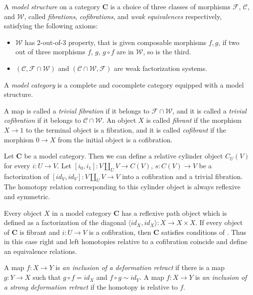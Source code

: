 \documentclass{amsart}
\theoremstyle{definition}
\newcommand{\we}{\mathcal{W}}
\newcommand{\fib}{\mathcal{F}}
\newcommand{\cof}{\mathcal{C}}
\newcommand{\cat}[1]{\mathbf{#1}}
\newcommand{\C}{\cat{C}}
\newcommand{\cyli}{i}
\begin{document}
\begin{defn}
A \emph{model structure} on a category $\C$ is a choice of three classes of morphisms $\fib$, $\cof$, and $\we$,
called \emph{fibrations}, \emph{cofibrations}, and \emph{weak equivalences} respectively, satisfying the following axioms:
\begin{itemize}
\item $\we$ has 2-out-of-3 property, that is given composable morphisms $f,g$,
    if two out of three morphisms $f$, $g$, $g \circ f$ are in $\we$, so is the third.
\item $(\cof, \fib \cap \we)$ and $(\cof \cap \we, \fib)$ are weak factorization systems.
\end{itemize}
A \emph{model category} is a complete and cocomplete category equipped with a model structure.
\end{defn}

A map is called a \emph{trivial fibration} if it belongs to $\fib \cap \we$,
and it is called a \emph{trivial cofibration} if it belongs to $\cof \cap \we$.
An object $X$ is called \emph{fibrant} if the morphism $X \to 1$ to the terminal object is a fibration,
and it is called \emph{cofibrant} if the morphism $0 \to X$ from the initial object is a cofibration.

Let $\C$ be a model category.
Then we can define a relative cylinder object $C_U(V)$ for every $i : U \to V$.
Let $[\cyli_0,\cyli_1] : V \amalg_U V \to C(V)$, $s : C(V) \to V$ be a factorization of $[id_V,id_V] : V \amalg_U V \to V$ into a cofibration and a trivial fibration.
The homotopy relation corresponding to this cylinder object is always reflexive and symmetric.

\begin{rem}
Every object $X$ in a model category $\C$ has a reflexive path object which is defined as a factorization of the diagonal $\langle id_X, id_X \rangle : X \to X \times X$.
If every object of $\C$ is fibrant and $i : U \to V$ is a cofibration, then $\C$ satisfies conditions of .
Thus in this case right and left homotopies relative to a cofibration coincide and define an equivalence relations.
\end{rem}

A map $f : X \to Y$ is \emph{an inclusion of a deformation retract} if there is
a map $g : Y \to X$ such that $g \circ f = id_X$ and $f \circ g \sim id_Y$.
A map $f : X \to Y$ is \emph{an inclusion of a strong deformation retract} if the homotopy is relative to $f$.
\end{document}
